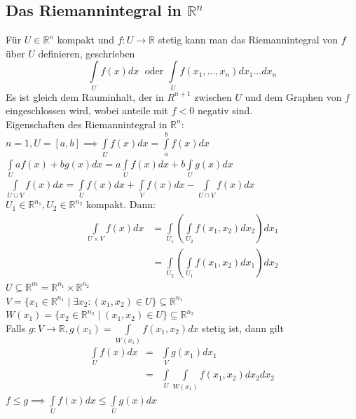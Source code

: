 \subsection{Das Riemannintegral in $\mathbb{R}^n$}
  Für $U\in\mathbb R^n$ kompakt und $f: U\rightarrow\mathbb R$ stetig kann man
  das Riemannintegral von $f$ über $U$ definieren, geschrieben
  $$\int\limits_Uf(x)dx\;\text{ oder }\int\limits_Uf(x_1,...,x_n)dx_1...dx_n$$
  Es ist gleich dem Rauminhalt, der in $R^{n+1}$ zwischen $U$ und dem Graphen
  von $f$ eingeschlossen wird, wobei anteile mit $f<0$ negativ sind.\\
  Eigenschaften des Riemannintegral in $\mathbb R^n$:\\
    $n=1, U=[a,b]\implies\int\limits_Uf(x)dx=\int\limits_a^bf(x)dx$\\
    $\int\limits_Uaf(x)+bg(x)dx=a\int\limits_Uf(x)dx+b\int\limits_Ug(x)dx$\\
    $\int\limits_{U\cup V}f(x)dx=\int\limits_Uf(x)dx+\int\limits_Vf(x)dx-\int\limits_{U\cap V}f(x)dx$\\
    $U_1\in\mathbb R^{n_1}, U_2\in\mathbb R^{n_2}$ kompakt. Dann:
    $$\begin{array}{ll}
      \int\limits_{U\times
      V}f(x)dx&=\int\limits_{U_1}\left(\int\limits_{U_2}f(x_1,x_2)dx_2\right)dx_1\\
      &=\int\limits_{U_2}\left(\int\limits_{U_1}f(x_1,x_2)dx_1\right)dx_2
    \end{array}$$
    $U\subseteq\mathbb R^m=\mathbb R^{n_1}\times\mathbb R^{n_2}$\\
    $V=\{x_1\in\mathbb R^{n_1}\mid\exists x_2:(x_1,x_2)\in U\}\subseteq\mathbb
    R^{n_1}$\\
    $W(x_1)=\{x_2\in\mathbb R^{n_2}\mid(x_1,x_2)\in U\}\subseteq\mathbb
    R^{n_2}$\\
    Falls $g:V\rightarrow \mathbb R, g(x_1)=\int\limits_{W(x_1)}f(x_1,x_2)dx$ stetig
    ist, dann gilt $$\begin{array}{lcl}
      \int\limits_Uf(x)dx&=&\int\limits_Vg(x_1)dx_1\\
      &=&\int\limits_U\int\limits_{W(x_1)}f(x_1,x_2)dx_2dx_2
    \end{array}$$
    $f\leq g\implies\int\limits_Uf(x)dx\leq\int\limits_Ug(x)dx$\\
